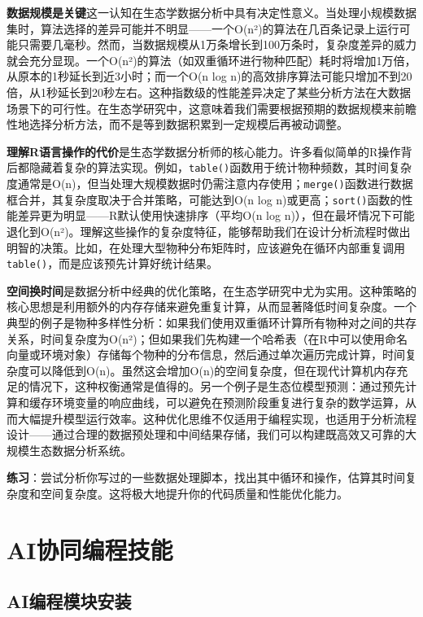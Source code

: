 \documentclass[
  twoside]{book}
\begin{document}
\textbf{数据规模是关键}这一认知在生态学数据分析中具有决定性意义。当处理小规模数据集时，算法选择的差异可能并不明显------一个O(n²)的算法在几百条记录上运行可能只需要几毫秒。然而，当数据规模从1万条增长到100万条时，复杂度差异的威力就会充分显现。一个O(n²)的算法（如双重循环进行物种匹配）耗时将增加1万倍，从原本的1秒延长到近3小时；而一个O(n log n)的高效排序算法可能只增加不到20倍，从1秒延长到20秒左右。这种指数级的性能差异决定了某些分析方法在大数据场景下的可行性。在生态学研究中，这意味着我们需要根据预期的数据规模来前瞻性地选择分析方法，而不是等到数据积累到一定规模后再被动调整。

\textbf{理解R语言操作的代价}是生态学数据分析师的核心能力。许多看似简单的R操作背后都隐藏着复杂的算法实现。例如，\texttt{table()}函数用于统计物种频数，其时间复杂度通常是O(n)，但当处理大规模数据时仍需注意内存使用；\texttt{merge()}函数进行数据框合并，其复杂度取决于合并策略，可能达到O(n log n)或更高；\texttt{sort()}函数的性能差异更为明显------R默认使用快速排序（平均O(n log n)），但在最坏情况下可能退化到O(n²)。理解这些操作的复杂度特征，能够帮助我们在设计分析流程时做出明智的决策。比如，在处理大型物种分布矩阵时，应该避免在循环内部重复调用\texttt{table()}，而是应该预先计算好统计结果。

\textbf{空间换时间}是数据分析中经典的优化策略，在生态学研究中尤为实用。这种策略的核心思想是利用额外的内存存储来避免重复计算，从而显著降低时间复杂度。一个典型的例子是物种多样性分析：如果我们使用双重循环计算所有物种对之间的共存关系，时间复杂度为O(n²)；但如果我们先构建一个哈希表（在R中可以使用命名向量或环境对象）存储每个物种的分布信息，然后通过单次遍历完成计算，时间复杂度可以降低到O(n)。虽然这会增加O(n)的空间复杂度，但在现代计算机内存充足的情况下，这种权衡通常是值得的。另一个例子是生态位模型预测：通过预先计算和缓存环境变量的响应曲线，可以避免在预测阶段重复进行复杂的数学运算，从而大幅提升模型运行效率。这种优化思维不仅适用于编程实现，也适用于分析流程设计------通过合理的数据预处理和中间结果存储，我们可以构建既高效又可靠的大规模生态数据分析系统。

\textbf{练习}：尝试分析你写过的一些数据处理脚本，找出其中循环和操作，估算其时间复杂度和空间复杂度。这将极大地提升你的代码质量和性能优化能力。

\hypertarget{aiux534fux540cux7f16ux7a0bux6280ux80fd}{%
\section{AI协同编程技能}\label{aiux534fux540cux7f16ux7a0bux6280ux80fd}}

\hypertarget{aiux7f16ux7a0bux6a21ux5757ux5b89ux88c5}{%
\subsection{AI编程模块安装}\label{aiux7f16ux7a0bux6a21ux5757ux5b89ux88c5}}
\end{document}
